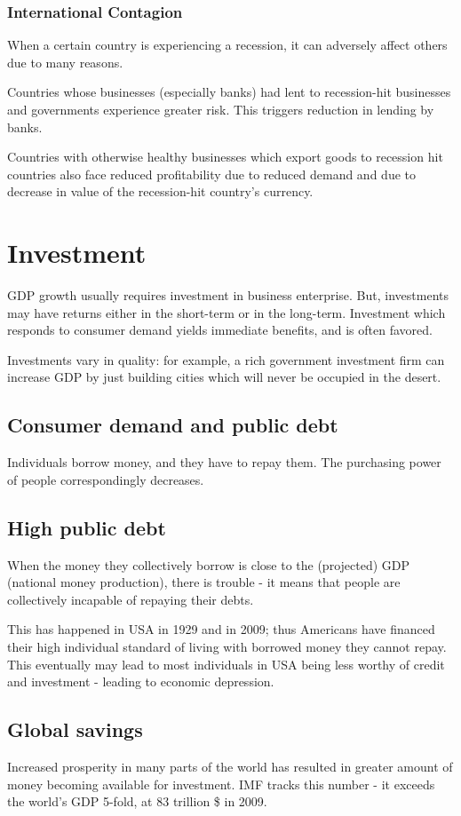 \documentclass[oneside, article]{memoir}
\begin{document}
\subsubsection{International Contagion}
When a certain country is experiencing a recession, it can adversely affect others due to many reasons.

Countries whose businesses (especially banks) had lent to recession-hit businesses and governments experience greater risk. This triggers reduction in lending by banks.

Countries with otherwise healthy businesses which export goods to recession hit countries also face reduced profitability due to reduced demand and due to decrease in value of the recession-hit country's currency.

\section{Investment}
GDP growth usually requires investment in business enterprise. But, investments may have returns either in the short-term or in the long-term. Investment which responds to consumer demand yields immediate benefits, and is often favored.

Investments vary in quality: for example, a rich government investment firm can increase GDP by just building cities which will never be occupied in the desert.

\subsection{Consumer demand and public debt}
Individuals borrow money, and they have to repay them. The purchasing power of people correspondingly decreases.

\subsection{High public debt}
When the money they collectively borrow is close to the (projected) GDP (national money production), there is trouble - it means that people are collectively incapable of repaying their debts.

This has happened in USA in 1929 and in 2009; thus Americans have financed their high individual standard of living with borrowed money they cannot repay. This eventually may lead to most individuals in USA being less worthy of credit and investment - leading to economic depression.

\subsection{Global savings}
Increased prosperity in many parts of the world has resulted in greater amount of money becoming available for investment. IMF tracks this number - it exceeds the world's GDP 5-fold, at 83 trillion \$ in 2009.
\end{document}
